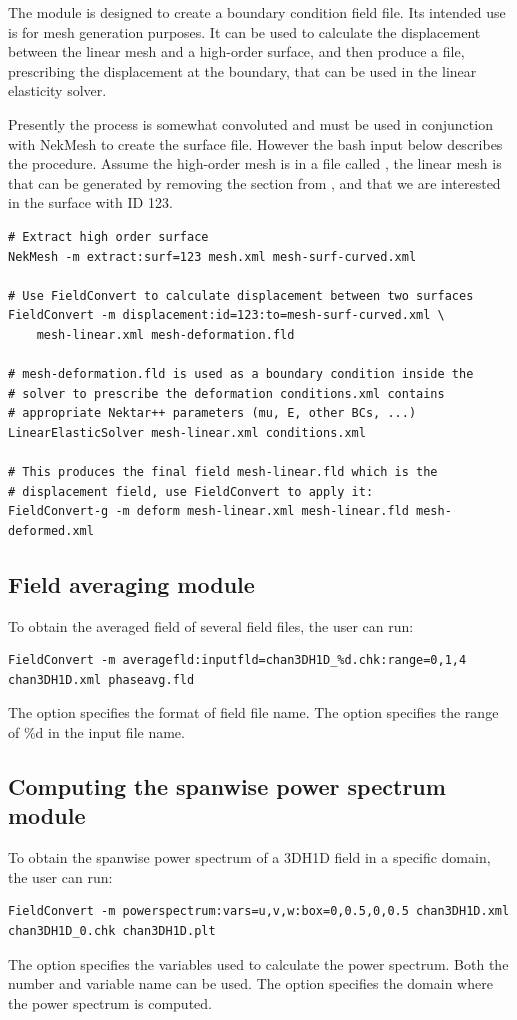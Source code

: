 The  module is designed to create a boundary condition field
file. Its intended use is for mesh generation purposes. It can be used to
calculate the displacement between the linear mesh and a high-order surface, and
then produce a  file, prescribing the displacement at the boundary,
that can be used in the linear elasticity solver.

Presently the process is somewhat convoluted and must be used in conjunction
with NekMesh to create the surface file. However the bash input below
describes the procedure. Assume the high-order mesh is in a file called
, the linear mesh is  that can be
generated by removing the  section from , and that
we are interested in the surface with ID 123.

\begin{lstlisting}[style=BashInputStyle]
# Extract high order surface
NekMesh -m extract:surf=123 mesh.xml mesh-surf-curved.xml

# Use FieldConvert to calculate displacement between two surfaces
FieldConvert -m displacement:id=123:to=mesh-surf-curved.xml \
    mesh-linear.xml mesh-deformation.fld

# mesh-deformation.fld is used as a boundary condition inside the
# solver to prescribe the deformation conditions.xml contains
# appropriate Nektar++ parameters (mu, E, other BCs, ...)
LinearElasticSolver mesh-linear.xml conditions.xml

# This produces the final field mesh-linear.fld which is the
# displacement field, use FieldConvert to apply it:
FieldConvert-g -m deform mesh-linear.xml mesh-linear.fld mesh-deformed.xml
\end{lstlisting}

\subsection{Field averaging module}
To obtain the averaged field of several field files, the user can run:
\begin{lstlisting}[style=BashInputStyle]
FieldConvert -m averagefld:inputfld=chan3DH1D_%d.chk:range=0,1,4 chan3DH1D.xml phaseavg.fld
\end{lstlisting}
The option  specifies the format of field file name. The option  specifies the range of \%d in the input file name.

\subsection{Computing the spanwise power spectrum module}
To obtain the spanwise power spectrum of a 3DH1D field in a specific domain, the user can run:
\begin{lstlisting}[style=BashInputStyle]
FieldConvert -m powerspectrum:vars=u,v,w:box=0,0.5,0,0.5 chan3DH1D.xml chan3DH1D_0.chk chan3DH1D.plt
\end{lstlisting}
The option  specifies the variables used to calculate the power spectrum. Both the number and variable name can be used. The option  specifies the domain where the power spectrum is computed.

